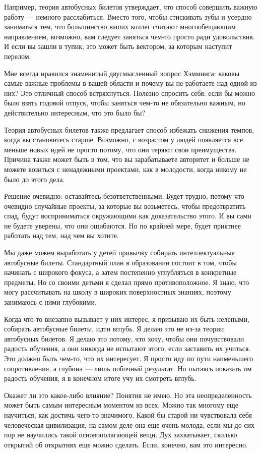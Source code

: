 \documentclass[ebook,12pt,oneside,openany]{memoir}
\begin{document}
Например, теория автобусных билетов утверждает, что способ совершить
важную работу — немного расслабиться. Вместо того, чтобы стискивать
зубы и усердно заниматься тем, что большинство ваших коллег считают
многообещающим направлением, возможно, вам следует заняться чем-то
просто ради удовольствия. И если вы зашли в тупик, это может быть
вектором, за которым наступит перелом. \newline

Мне всегда нравился знаменитый двусмысленный вопрос Хэмминга: каковы
самые важные проблемы в вашей области и почему вы не работаете над
одной из них? Это отличный способ встряхнуться. Полезно спросить себя:
если бы можно было взять годовой отпуск, чтобы заняться чем-то не
обязательно важным, но действительно интересным, что это было бы? \newline

Теория автобусных билетов также предлагает способ избежать снижения
темпов, когда вы становитесь старше. Возможно, с возрастом у людей
появляется все меньше новых идей не просто потому, что они теряют свои
преимущества. Причина также может быть в том, что вы зарабатываете
авторитет и больше не можете возиться с ненадежными проектами, как в
молодости, когда никому не было до этого дела. \newline

Решение очевидно: оставайтесь безответственными. Будет трудно, потому
что очевидно случайные проекты, за которые вы возьметесь, чтобы
предотвратить спад, будут восприниматься окружающими как
доказательство этого. И вы сами не будете уверены, что они ошибаются.
Но по крайней мере, будет приятнее работать над тем, над чем вы
хотите. \newline

Мы даже можем выработать у детей привычку собирать интеллектуальные
автобусные билеты. Стандартный план в образовании состоит в том, чтобы
начинать с широкого фокуса, а затем постепенно углубляться в
конкретные предметы. Но со своими детьми я сделал прямо
противоположное. Я знаю, что могу рассчитывать на школу в широких
поверхностных знаниях, поэтому занимаюсь с ними глубокими. \newline

Когда что-то внезапно вызывает у них интерес, я призываю их быть
нелепыми, собирать автобусные билеты, идти вглубь. Я делаю это не
из-за теории автобусных билетов. Я делаю это потому, что хочу, чтобы
они почувствовали радость обучения, а они никогда не испытают этого,
если заставить их учиться. Это должно быть чем-то, что их интересует.
Я просто иду по пути наименьшего сопротивления, а глубина — лишь
побочный результат. Но пытаясь показать им радость обучения, я в
конечном итоге учу их смотреть вглубь. \newline

Окажет ли это какое-либо влияние? Понятия не имею. Но эта
неопределенность может быть самым интересным моментом из всех. Можно
так многому еще научиться, как достичь чего-то значимого. Какой бы
старой ни чувствовала себя человеческая цивилизация, на самом деле она
еще очень молода, если мы до сих пор не научились такой
основополагающей вещи. Дух захватывает, сколько открытий об открытиях
еще можно сделать. Если, конечно, вам это интересно. 
\end{document}
